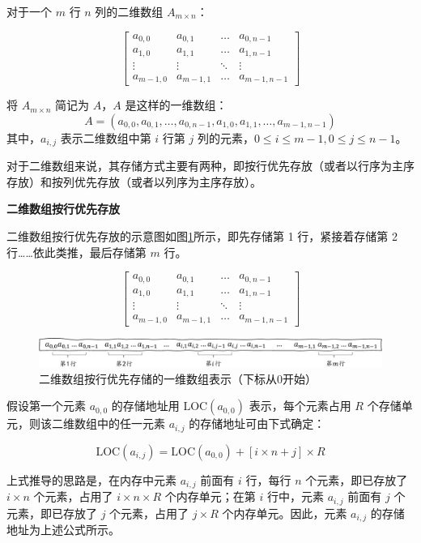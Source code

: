 \documentclass[lang=cn,newtx,10pt,scheme=chinese]{elegantbook}
\begin{document}
对于一个 $m$ 行 $n$ 列的二维数组 $A_{m \times n}$：

\[
\begin{bmatrix}
a_{0,0} & a_{0,1} & \dots & a_{0,n-1} \\
a_{1,0} & a_{1,1} & \dots & a_{1,n-1} \\
\vdots & \vdots & \ddots & \vdots \\
a_{m-1,0} & a_{m-1,1} & \dots & a_{m-1,n-1}
\end{bmatrix}
\]

将 $A_{m \times n}$ 简记为 $A$，$A$ 是这样的一维数组：
\[
A = (a_{0,0}, a_{0,1}, \dots, a_{0,n-1}, a_{1,0}, a_{1,1}, \dots, a_{m-1,n-1})
\]
其中，$a_{i,j}$ 表示二维数组中第 $i$ 行第 $j$ 列的元素，$0 \leq i \leq m -1 , 0 \leq j \leq n-1$。

对于二维数组来说，其存储方式主要有两种，即按行优先存放（或者以行序为主序存放）和按列优先存放（或者以列序为主序存放）。

\textbf{二维数组按行优先存放}

二维数组按行优先存放的示意图如图\ref{fig:row_major_array}所示，即先存储第 1 行，紧接着存储第 2 行……依此类推，最后存储第 $m$ 行。

\[
\begin{bmatrix}
a_{0,0} & a_{0,1} & \dots & a_{0,n-1} \\
a_{1,0} & a_{1,1} & \dots & a_{1,n-1} \\
\vdots & \vdots & \ddots & \vdots \\
a_{m-1,0} & a_{m-1,1} & \dots & a_{m-1,n-1}
\end{bmatrix}
\]

\begin{figure}[h]
  \centering
  \includegraphics[width=1\textwidth]{./figure/pdf/cropped/rowFirst.pdf}
  \caption{二维数组按行优先存储的一维数组表示（下标从0开始）}
  \label{fig:row_major_array}
\end{figure}

假设第一个元素 $a_{0,0}$ 的存储地址用 $\text{LOC}(a_{0,0})$ 表示，每个元素占用 $R$ 个存储单元，则该二维数组中的任一元素 $a_{i,j}$ 的存储地址可由下式确定：

\begin{equation}
\text{LOC}(a_{i,j}) = \text{LOC}(a_{0,0}) + [i \times n + j] \times R
\end{equation}

上式推导的思路是，在内存中元素 $a_{i,j}$ 前面有 $i$ 行，每行 $n$ 个元素，即已存放了 $i \times n$ 个元素，占用了 $i \times n \times R$ 个内存单元；在第 $i$ 行中，元素 $a_{i,j}$ 前面有 $j$ 个元素，即已存放了 $j$ 个元素，占用了 $j \times R$ 个内存单元。因此，元素 $a_{i,j}$ 的存储地址为上述公式所示。
\end{document}
